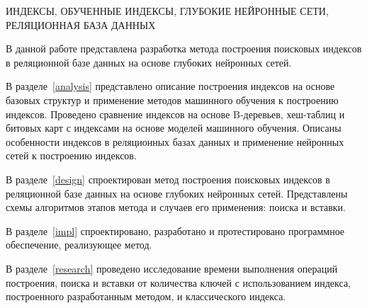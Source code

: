 \begin{essay}{}
    \noindent\mbox{ИНДЕКСЫ,}  \mbox{ОБУЧЕННЫЕ} \mbox{ИНДЕКСЫ,} \mbox{ГЛУБОКИЕ}
    \mbox{НЕЙРОННЫЕ} \mbox{СЕТИ}, \mbox{РЕЛЯЦИОННАЯ} \mbox{БАЗА} \mbox{ДАННЫХ}

    В данной работе представлена разработка метода построения поисковых индексов
    в реляционной базе данных на основе глубоких нейронных сетей.

    В разделе~\ref{analysis} представлено описание построения индексов на основе
    базовых структур и применение методов машинного обучения к построению
    индексов. Проведено сравнение индексов на основе B-деревьев, хеш-таблиц и
    битовых карт с индексами на основе моделей машинного обучения. Описаны
    особенности индексов в реляционных базах данных и применение нейронных сетей
    к построению индексов.

    В разделе~\ref{design} спроектирован метод построения поисковых индексов в
    реляционной базе данных на основе глубоких нейронных сетей. Представлены
    схемы алгоритмов этапов метода и случаев его применения: поиска и вставки.

    В разделе~\ref{impl} спроектировано, разработано и протестировано
    программное обеспечение, реализующее метод.

    В разделе~\ref{research} проведено исследование времени выполнения операций
    построения, поиска и вставки от количества ключей с использованием индекса,
    построенного разработанным методом, и классического индекса.
\end{essay}
